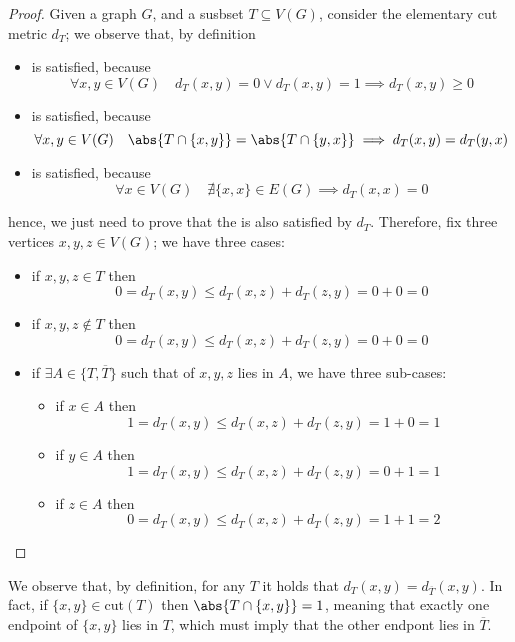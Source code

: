 \documentclass[a4paper, 12pt]{report}
\begin{document}
    \begin{proof}
        Given a graph $G$, and a susbset $T \subseteq V(G)$, consider the elementary cut metric $d_T$; we observe that, by definition

        \begin{itemize}
            \item {} is satisfied, because $$\forall x, y \in V(G) \quad d_T(x, y) = 0 \lor d_T(x, y) = 1 \implies d_T(x, y) \ge 0$$
            \item {} is satisfied, because $$\forall x, y \in V(G) \quad \abs{T \cap \{x, y\}} = \abs{T \cap \{y, x\}} \implies d_T(x, y) = d_T(y, x)$$
            \item {} is satisfied, because $$\forall x \in V(G) \quad \nexists \{x, x\} \in E(G) \implies d_T(x, x) =0$$
        \end{itemize}
        
        hence, we just need to prove that the  is also satisfied by $d_T$. Therefore, fix three vertices $x, y, z \in V(G)$; we have three cases:

        \begin{itemize}
            \item if $x, y, z \in T$ then $$0 = d_T(x, y) \le d_T(x, z) + d_T(z, y) = 0 + 0 = 0$$
            \item if $x, y, z \notin T$ then $$0 = d_T(x, y) \le d_T(x, z) + d_T(z, y) = 0 + 0 = 0$$
            \item if $\exists A \in \{T, \overline T\}$ such that  of $x, y, z$ lies in $A$, we have three sub-cases:
                \begin{itemize}
                    \item if $x \in A$ then $$1 = d_T(x, y) \le d_T(x, z) + d_T(z, y) = 1 + 0 = 1$$
                    \item if $y \in A$ then $$1 = d_T(x, y) \le d_T(x, z) + d_T(z, y) = 0 + 1 = 1$$
                    \item if $z \in A$ then $$0 = d_T(x, y) \le d_T(x, z) + d_T(z, y) = 1 + 1 = 2$$
                \end{itemize}
        \end{itemize}
    \end{proof}

    We observe that, by definition, for any $T$ it holds that $d_T(x, y) = d_{\overline T}(x, y)$. In fact, if $\{x, y\} \in \mathrm{cut}(T)$ then $\abs{T \cap \{x, y\}} = 1$, meaning that exactly one endpoint of $\{x, y\}$ lies in $T$, which must imply that the other endpont lies in $\overline T$.
\end{document}
